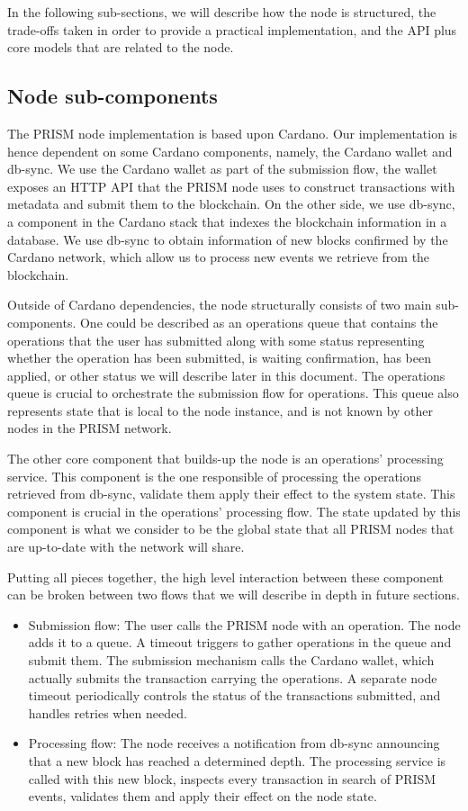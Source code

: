 \documentclass[10pt,a4paper]{article}
\begin{document}
In the following sub-sections, we will describe how the node is structured, the trade-offs taken in order to provide a practical implementation, and the API plus core models that are related to the node.

\subsection{Node sub-components}

The PRISM node implementation is based upon Cardano. Our implementation is hence dependent on some Cardano components, namely, the Cardano wallet and db-sync. We use the Cardano wallet as part of the submission flow, the wallet exposes an HTTP API that the PRISM node uses to construct transactions with metadata and submit them to the blockchain. On the other side, we use db-sync, a component in the Cardano stack that indexes the blockchain information in a database. We use db-sync to obtain information of new blocks confirmed by the Cardano network, which allow us to process new events we retrieve from the blockchain.

Outside of Cardano dependencies, the node structurally consists of two main sub-components. One could be described as an operations queue that contains the operations that the user has submitted along with some status representing whether the operation has been submitted, is waiting confirmation, has been applied, or other status we will describe later in this document. The operations queue is crucial to orchestrate the submission flow for operations. This queue also represents state that is local to the node instance, and is not known by other nodes in the PRISM network. 

The other core component that builds-up the node is an operations' processing service. This component is the one responsible of processing the operations retrieved from db-sync, validate them apply their effect to the system state. This component is crucial in the operations' processing flow. The state updated by this component is what we consider to be the global state that all PRISM nodes that are up-to-date with the network will share.

Putting all pieces together, the high level interaction between these component can be broken between two flows that we will describe in depth in future sections.
\begin{itemize}
  \item Submission flow: The user calls the PRISM node with an operation. The node adds it to a queue. A timeout triggers to gather operations in the queue and submit them. The submission mechanism calls the Cardano wallet, which actually submits the transaction carrying the operations. A separate node timeout periodically controls the status of the transactions submitted, and handles retries when needed.
  \item Processing flow: The node receives a notification from db-sync announcing that a new block has reached a determined depth. The processing service is called with this new block, inspects every transaction in search of PRISM events, validates them and apply their effect on the node state.
\end{itemize} 
\end{document}
